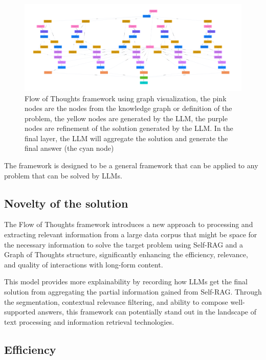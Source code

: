 \documentclass{article}
\begin{document}
    \begin{figure}[h]
        \centering
        \includegraphics[width=1.0\textwidth]{images/flow_of_thoughts.png}
        \caption{Flow of Thoughts framework using graph visualization, the pink nodes are the nodes from the knowledge graph or definition of the problem, the yellow nodes are generated by the LLM, the purple nodes are refinement of the solution generated by the LLM. In the final layer, the LLM will aggregate the solution and generate the final answer (the cyan node)}
        \label{fig:flow_of_thoughts}
    \end{figure}

    The framework is designed to be a general framework that can be applied to any problem that can be solved by LLMs.

\subsection{Novelty of the solution}

The Flow of Thoughts framework introduces a new approach to processing and extracting relevant information from a large data corpus that might be space for the necessary information to solve the target problem using Self-RAG and a Graph of Thoughts structure, significantly enhancing the efficiency, relevance, and quality of interactions with long-form content. 

This model provides more explainability by recording how LLMs get the final solution from aggregating the partial information gained from Self-RAG. Through the segmentation, contextual relevance filtering, and ability to compose well-supported answers, this framework can potentially stand out in the landscape of text processing and information retrieval technologies.

\subsection{Efficiency}
\end{document}
